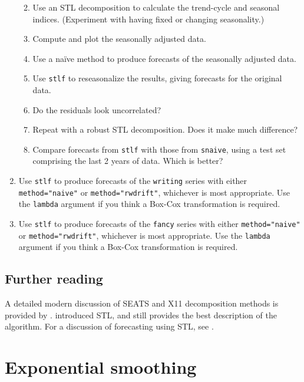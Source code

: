 \documentclass[]{book}
\providecommand{\tightlist}{%
  \setlength{\itemsep}{0pt}\setlength{\parskip}{0pt}}
\begin{document}
\begin{enumerate}
  \begin{enumerate}
  \def\labelenumii{\alph{enumii}.}
  \tightlist
  \item
    Use an STL decomposition to calculate the trend-cycle and seasonal indices. (Experiment with having fixed or changing seasonality.)
  \item
    Compute and plot the seasonally adjusted data.
  \item
    Use a naïve method to produce forecasts of the seasonally adjusted data.
  \item
    Use \texttt{stlf} to reseasonalize the results, giving forecasts for the original data.
  \item
    Do the residuals look uncorrelated?
  \item
    Repeat with a robust STL decomposition. Does it make much difference?
  \item
    Compare forecasts from \texttt{stlf} with those from \texttt{snaive}, using a test set comprising the last 2 years of data. Which is better?
  \end{enumerate}
\item
  Use \texttt{stlf} to produce forecasts of the \texttt{writing} series with either \texttt{method="naive"} or \texttt{method="rwdrift"}, whichever is most appropriate. Use the \texttt{lambda} argument if you think a Box-Cox transformation is required.
\item
  Use \texttt{stlf} to produce forecasts of the \texttt{fancy} series with either \texttt{method="naive"} or \texttt{method="rwdrift"}, whichever is most appropriate. Use the \texttt{lambda} argument if you think a Box-Cox transformation is required.
\end{enumerate}

\hypertarget{further-reading-4}{%
\section{Further reading}\label{further-reading-4}}

A detailed modern discussion of SEATS and X11 decomposition methods is provided by \citet{Dagum2016}. \citet{Cleveland1990} introduced STL, and still provides the best description of the algorithm. For a discussion of forecasting using STL, see \citet{Theodosiou2011}.

\hypertarget{ch-expsmooth}{%
\chapter{Exponential smoothing}\label{ch-expsmooth}}
\end{document}
